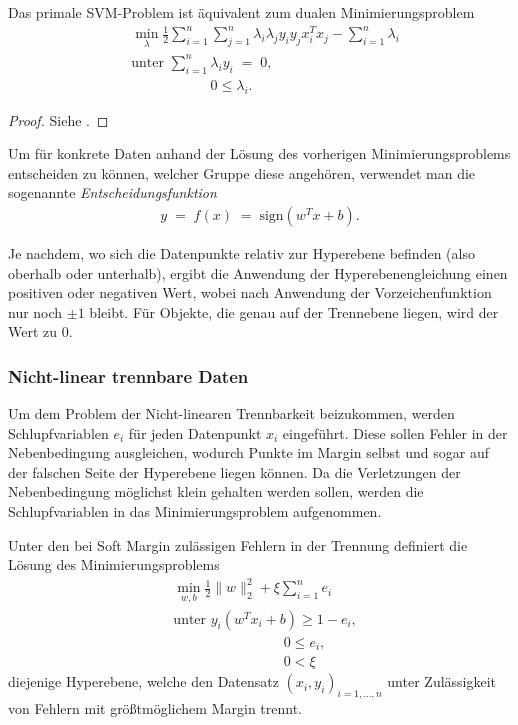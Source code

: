 \begin{satz}
	Das primale SVM-Problem ist äquivalent zum dualen Minimierungsproblem
	\begin{align*}
		&\min_{\lambda} \frac{1}{2}\sum_{i=1}^{n}\sum_{j=1}^{n}\lambda_i\lambda_jy_iy_jx_i^Tx_j-\sum_{i=1}^{n}\lambda_i\\
		&\text{unter } \sum_{i=1}^{n}\lambda_iy_i\;=\;0,\\
		&\qquad\qquad\quad\:\:\: 0\leq\lambda_i.
	\end{align*}
\end{satz}

\begin{proof}
	Siehe \cite{SVM}.
\end{proof}

\begin{defi}[Entscheidungsfunktion]
	Um für konkrete Daten anhand der Lösung des vorherigen Minimierungsproblems entscheiden zu können, welcher Gruppe diese angehören, verwendet man die sogenannte \textit{Entscheidungsfunktion}
	\begin{align*}
		y\;=\;f(x)\;=\;\text{sign}\left(w^Tx+b\right).
	\end{align*}
	\label{defi:decision}
\end{defi}
Je nachdem, wo sich die Datenpunkte relativ zur Hyperebene befinden (also oberhalb oder unterhalb), ergibt die Anwendung der Hyperebenengleichung einen positiven oder negativen Wert, wobei nach Anwendung der Vorzeichenfunktion nur noch \(\pm1\) bleibt. Für Objekte, die genau auf der Trennebene liegen, wird der Wert zu \(0\).

\subsubsection{Nicht-linear trennbare Daten}

Um dem Problem der Nicht-linearen Trennbarkeit beizukommen, werden Schlupfvariablen \(e_i\) für jeden Datenpunkt \(x_i\) eingeführt. Diese sollen Fehler in der Nebenbedingung ausgleichen, wodurch Punkte im Margin selbst und sogar auf der falschen Seite der Hyperebene liegen können. Da die Verletzungen der Nebenbedingung möglichst klein gehalten werden sollen, werden die Schlupfvariablen in das Minimierungsproblem aufgenommen.

\begin{satz}
	Unter den bei Soft Margin zulässigen Fehlern in der Trennung definiert die Lösung des Minimierungsproblems
	\begin{align*}
		 &\min_{w,b} \frac{1}{2}\|w\|^2_2 + \xi\sum_{i=1}^{n}e_i\\
		 &\text{unter } y_i\left(w^Tx_i+b\right)\geq 1-e_i,\\
		 &\qquad\qquad\qquad\quad\:\:\:\:  0\leq e_i,\\
		 &\qquad\qquad\qquad\quad\:\:\:\:  0< \xi
	\end{align*}
	diejenige Hyperebene, welche den Datensatz \((x_i,y_i)_{i=1,\dots,n}\) unter Zulässigkeit von Fehlern mit größtmöglichem Margin trennt.
\end{satz}

